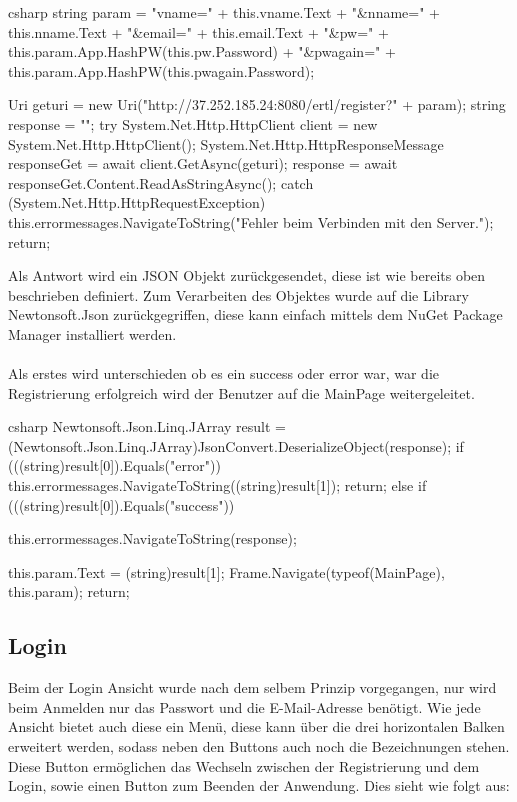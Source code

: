 \begin{code}{csharp}
	string param = "vname=" + this.vname.Text + "&nname=" + this.nname.Text + "&email=" + this.email.Text + "&pw=" + this.param.App.HashPW(this.pw.Password) + "&pwagain=" + this.param.App.HashPW(this.pwagain.Password);
	
	Uri geturi = new Uri("http://37.252.185.24:8080/ertl/register?" + param);
	string response = "";
	try
	{
		System.Net.Http.HttpClient client = new System.Net.Http.HttpClient();
		System.Net.Http.HttpResponseMessage responseGet = await client.GetAsync(geturi);
		response = await responseGet.Content.ReadAsStringAsync();
	}
	catch (System.Net.Http.HttpRequestException)
	{
		this.errormessages.NavigateToString("Fehler beim Verbinden mit den Server.");
		return;
	}
\end{code}

Als Antwort wird ein JSON Objekt zurückgesendet, diese ist wie bereits oben beschrieben definiert. Zum Verarbeiten des Objektes wurde auf die Library Newtonsoft.Json zurückgegriffen, diese kann einfach mittels dem NuGet Package Manager installiert werden.
\\\\
Als erstes wird unterschieden ob es ein success oder error war, war die Registrierung erfolgreich wird der Benutzer auf die MainPage weitergeleitet.

\begin{code}{csharp}
Newtonsoft.Json.Linq.JArray result = (Newtonsoft.Json.Linq.JArray)JsonConvert.DeserializeObject(response);
if (((string)result[0]).Equals("error"))
{
	this.errormessages.NavigateToString((string)result[1]);
	return;
}
else if (((string)result[0]).Equals("success"))
{
	this.errormessages.NavigateToString(response);
	
	this.param.Text = (string)result[1];
	Frame.Navigate(typeof(MainPage), this.param);
	return;
}
\end{code}

\subsection{Login}

Beim der Login Ansicht wurde nach dem selbem Prinzip vorgegangen, nur wird beim Anmelden nur das Passwort und die E-Mail-Adresse benötigt. Wie jede Ansicht bietet auch diese ein Menü, diese kann über die drei horizontalen Balken erweitert werden, sodass neben den Buttons auch noch die Bezeichnungen stehen. Diese Button ermöglichen das Wechseln zwischen der Registrierung und dem Login, sowie einen Button zum Beenden der Anwendung. Dies sieht wie folgt aus:

